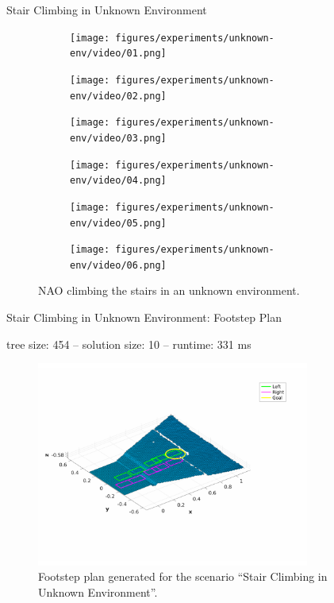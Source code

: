 \documentclass[10pt]{beamer}
\begin{document}
\begin{frame}{Stair Climbing in Unknown Environment}
	\begin{figure}
		\begin{subfigure}{0.40\textwidth}
			\texttt{[image: figures/experiments/unknown-env/video/01.png]}
		\end{subfigure}\hspace{0.05cm}%
		\begin{subfigure}{0.40\textwidth}
			\texttt{[image: figures/experiments/unknown-env/video/02.png]}
		\end{subfigure}
		\begin{subfigure}{0.40\textwidth}
			\texttt{[image: figures/experiments/unknown-env/video/03.png]}
		\end{subfigure}\hspace{0.05cm}%
		\begin{subfigure}{0.40\textwidth}
			\texttt{[image: figures/experiments/unknown-env/video/04.png]}
		\end{subfigure}
		\begin{subfigure}{0.40\textwidth}
			\texttt{[image: figures/experiments/unknown-env/video/05.png]}
		\end{subfigure}\hspace{0.05cm}%
		\begin{subfigure}{0.40\textwidth}
			\texttt{[image: figures/experiments/unknown-env/video/06.png]}
		\end{subfigure}
		\caption{NAO climbing the stairs in an unknown environment.}
	\end{figure}
\end{frame}

\begin{frame}{Stair Climbing in Unknown Environment: Footstep Plan}
	\begin{center}
    tree size: 454 -- solution size: 10 -- runtime: 331 ms
  \end{center}
	\begin{figure}
		\centering
		\includegraphics[width=0.8\textwidth]
				{figures/experiments/unknown-env/footstep-plan.pdf}
		\caption{Footstep plan generated for the scenario ``Stair Climbing in
				Unknown Environment''.}
	\end{figure}
\end{frame}
\end{document}

